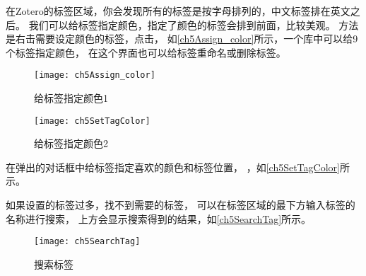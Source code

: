 \documentclass[cn,11pt,chinese]{elegantbook}
\begin{document}
			在Zotero的标签区域，你会发现所有的标签是按字母排列的，中文标签排在英文之后。
			我们可以给标签指定颜色，指定了颜色的标签会排到前面，比较美观。
			方法是右击需要设定颜色的标签，点击，
			如\autoref{ch5Assign_color}所示，一个库中可以给9个标签指定颜色，
			在这个界面也可以给标签重命名或删除标签。
				\begin{figure}[htbp]
					\begin{minipage}[t]{\dimexpr0.5\textwidth-4em}
						\centering
						\texttt{[image: ch5Assign\_color]}
						\caption{给标签指定颜色1}
						\label{ch5Assign_color}
					\end{minipage}
					\begin{minipage}[t]{\dimexpr0.5\textwidth-4em}
						\centering
						\texttt{[image: ch5SetTagColor]}
						\caption{给标签指定颜色2}
						\label{ch5SetTagColor}
					\end{minipage}
			\end{figure}	
					
					
					
				
				
在弹出的对话框中给标签指定喜欢的颜色和标签位置，
，如\autoref{ch5SetTagColor}所示。
				
				如果设置的标签过多，找不到需要的标签，
				可以在标签区域的最下方输入标签的名称进行搜索，
				上方会显示搜索得到的结果，如\autoref{ch5SearchTag}所示。
				\begin{figure}[htbp]
					\centering
					\texttt{[image: ch5SearchTag]}
					\caption{搜索标签}
					\label{ch5SearchTag}
				\end{figure}
			
\end{document}
